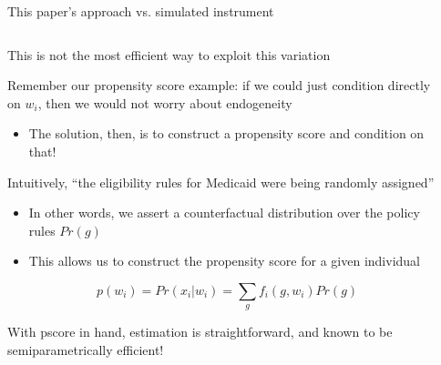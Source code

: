 \documentclass[notes,11pt, aspectratio=169]{beamer}
\newenvironment{wideitemize}{\itemize\addtolength{\itemsep}{10pt}}{\enditemize}
\begin{document}
\begin{frame}{This paper's approach vs. simulated instrument}
\begin{columns}[T] %
\begin{column}{.9\textwidth}
  \begin{wideitemize}
  \item This is not the most efficient way to exploit this variation
  \item Remember our propensity score example: if we could just
    condition directly on $w_{i}$, then we would not worry about
    endogeneity
    \begin{itemize}
    \item The solution, then, is to construct a propensity score and condition on that!
    \end{itemize}
  \item Intuitively, ``the eligibility rules for Medicaid were being randomly assigned''
    \begin{itemize}
    \item In other words, we assert a counterfactual distribution over
      the policy rules $Pr(g)$
    \item This allows us to construct the propensity score for a given individual
    \end{itemize}
    \begin{equation*}
      p(w_{i}) = Pr(x_{i} | w_{i}) = \sum_{g} f_{i}(g, w_{i}) Pr(g)
    \end{equation*}
  \item With pscore in hand, estimation is straightforward, and known to be semiparametrically efficient!
  \end{wideitemize}
\end{column}%
\hfill%
\begin{column}{.25\textwidth}
\end{column}%
\end{columns}
\end{frame}
\end{document}
